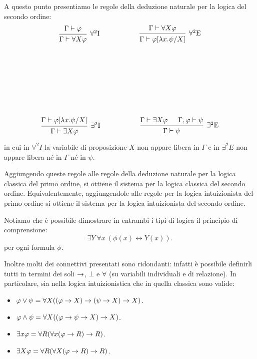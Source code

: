 \documentclass[]{marticle}
\begin{document}
A questo punto presentiamo le regole della deduzione naturale per la
logica del secondo ordine:
\begin{gather*}
    \begin{prooftree}
        \hypo{\Gamma\vdash\phi}
        \infer1[$\forall^2$I]{\Gamma \vdash \forall X\phi}
    \end{prooftree}
    \hspace{2cm}
    \begin{prooftree}
        \hypo{\Gamma \vdash \forall X\phi}
        \infer1[$\forall^2$E]{\Gamma \vdash \phi\sub{\l x.\psi}{X}}
    \end{prooftree} \\ \vspace{3cm} \\
    \begin{prooftree}
        \hypo{\Gamma\vdash\phi\sub{\l x. \psi}{X}}
        \infer1[$\exists^2$I]{\Gamma \vdash \exists X\phi}
    \end{prooftree}
    \hspace{2cm}
    \begin{prooftree}
        \hypo{\Gamma \vdash \exists X\phi}
        \hypo{\Gamma,\phi \vdash \psi}
        \infer2[$\exists^2$E]{\Gamma \vdash \psi}
    \end{prooftree} 
\end{gather*}

in cui in $\forall^2I$ la variabile di proposizione $X$ non appare libera in
$\Gamma$ e in $\exists^2E$ non appare libera n\'e in $\Gamma$ n\'e in $\psi$.

Aggiungendo queste regole alle regole della deduzione naturale per la logica
classica del primo ordine, si ottiene il sistema per la logica classica del
secondo ordine. Equivalentemente, aggiungendole alle regole per la logica
intuizionista del primo ordine si ottiene il sistema per la logica intuizionista
del secondo ordine.

Notiamo che \`e possibile dimostrare in entrambi i tipi di logica il principio
di comprensione:
\[
    \exists Y\ \forall x\ (\phi(x) \leftrightarrow Y(x)).
\]
per ogni formula $\phi$.

Inoltre molti dei connettivi presentati sono ridondanti: infatti \`e possibile
definirli tutti in termini dei soli $\rightarrow$, $\bot$ e $\forall$ (su variabili
individuali e di relazione). In particolare, sia nella logica intuizionistica
che in quella classica sono valide: 
\begin{itemize}
    \item $\varphi \lor \psi = \forall X ((\varphi\rightarrow X)\rightarrow (\psi\rightarrow X) \rightarrow X)$.
    \item $\varphi \land \psi = \forall X ((\varphi\rightarrow\psi\rightarrow X) \rightarrow X)$.
    \item $\exists x \varphi = \forall R (\forall x(\varphi\rightarrow R)\rightarrow R)$.
    \item $\exists X \varphi = \forall R (\forall X(\varphi\rightarrow R)\rightarrow R)$.
\end{itemize}
    
\end{document}

